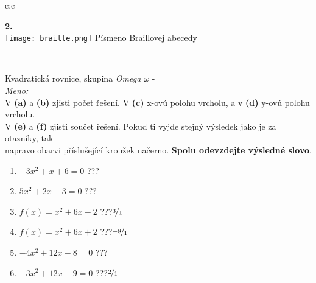 \documentclass[10pt]{report}
\begin{document}
\begin{tabular}{c:c}
\begin{minipage}[c][99mm][t]{0.49\linewidth}
\begin{center}
\begin{minipage}{0.20\linewidth}
\begin{center}
{\Huge\bfseries 2.} \\[2mm]
\texttt{[image: braille.png]}
{\small Písmeno Braillovej abecedy}
\end{center}
\end{minipage}
\end{center}
\end{minipage}
\\ \hdashline
\begin{minipage}[c][99mm][t]{0.49\linewidth}
\begin{center}
\vspace{7mm}
{\huge Kvadratická rovnice, skupina \textit{Omega $\omega$} -}\\[4.5mm]
\textit{Meno:}\phantom{xxxxxxxxxxxxxxxxxxxxxxxxxxxxxxxxxxxxxxxxxxxxxxxxxxxxxxxxxxxxxxxxx}\\[3.5mm]
V \textbf{(a)} a \textbf{(b)} zjisti počet řešení. V \textbf{(c)} x-ovú polohu vrcholu, a v \textbf{(d)} y-ovú polohu vrcholu.\\V \textbf{(e)} a \textbf{(f)} zjisti součet řešení. Pokud ti vyjde stejný výsledek jako je za otazníky, tak\\napravo obarvi příslušející kroužek načerno. \textbf{Spolu odevzdejte výsledné slovo}.\\[3mm]
\begin{minipage}{0.77\linewidth}
\begin{center}
\begin{varwidth}{\textwidth}
\begin{enumerate}
\large
\item $-3x^2+x+6=0$\quad \dotfill\; ???\;\dotfill {}
\item $5x^2+2x-3=0$\quad \dotfill\; ???\;\dotfill {}
\item $f(x)=x^2+6x-2$\quad \dotfill\; ???\;\dotfill \quad $\nicefrac{3}{1}$
\item $f(x)=x^2+6x+2$\quad \dotfill\; ???\;\dotfill \quad $\nicefrac{-8}{1}$
\item $-4x^2+12x-8=0$\quad \dotfill\; ???\;\dotfill {}
\item $-3x^2+12x-9=0$\quad \dotfill\; ???\;\dotfill \quad $\nicefrac{2}{1}$
\end{enumerate}
\end{varwidth}
\end{center}
\end{minipage}
\begin{minipage}{0.20\linewidth}
\begin{center}

\end{center}
\end{minipage}
\end{center}
\end{minipage}
\end{tabular}
\end{document}
